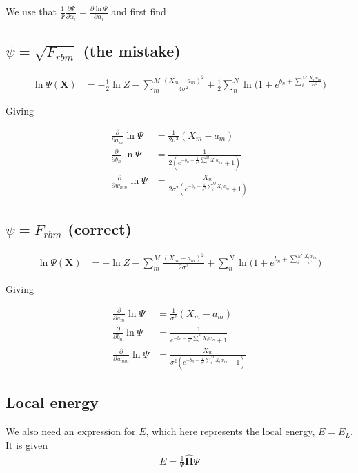\documentclass[norsk,a4paper,11pt]{article}
\begin{document}
We use that $\frac{1}{\Psi}\frac{\partial \Psi}{\partial \alpha_i} 
	= \frac{\partial \ln{\Psi}}{\partial \alpha_i}$
and first find 

\color{Green}
\subsection{$\psi = \sqrt{F_{rbm}}$ (the mistake)}
\color{Black}
\begin{align}
	\ln{\Psi({\mathbf{X}})} &= -\frac{1}{2}\ln{Z} - \sum_m^M \frac{(X_m - a_m)^2}{4\sigma^2}
	+ \frac{1}{2}\sum_n^N \ln({1 + e^{b_n + \sum_i^M \frac{X_i w_{in}}{\sigma^2}})}
\end{align}

Giving

\begin{align}
	\frac{\partial }{\partial a_m} \ln\Psi
	&= 	\frac{1}{2\sigma^2} (X_m - a_m) \\
	\frac{\partial }{\partial b_n} \ln\Psi
	&=
	\frac{1}{2(e^{-b_n-\frac{1}{\sigma^2}\sum_i^M X_i w_{in}} + 1)} \\
	\frac{\partial }{\partial w_{mn}} \ln\Psi
	&= \frac{X_m}{2\sigma^2(e^{-b_n-\frac{1}{\sigma^2}\sum_i^M X_i w_{in}} + 1)}
\end{align}

\color{Blue}
\subsection{$\psi = F_{rbm}$ (correct)}
\color{Black}
\begin{align}
	\ln{\Psi({\mathbf{X}})} &= -\ln{Z} - \sum_m^M \frac{(X_m - a_m)^2}{2\sigma^2}
	+ \sum_n^N \ln({1 + e^{b_n + \sum_i^M \frac{X_i w_{in}}{\sigma^2}})}
\end{align}

Giving

\begin{align}
	\frac{\partial }{\partial a_m} \ln\Psi
	&= 	\frac{1}{\sigma^2} (X_m - a_m) \\
	\frac{\partial }{\partial b_n} \ln\Psi
	&=
	\frac{1}{e^{-b_n-\frac{1}{\sigma^2}\sum_i^M X_i w_{in}} + 1} \\
	\frac{\partial }{\partial w_{mn}} \ln\Psi
	&= \frac{X_m}{\sigma^2(e^{-b_n-\frac{1}{\sigma^2}\sum_i^M X_i w_{in}} + 1)}
\end{align}

\subsection{Local energy}
We also need an expression for $E$, which here represents the local energy, $E=E_L$. It is given
\begin{align}
	E = \frac{1}{\Psi} \hat{\mathbf{H}} \Psi
\end{align}
\end{document}

